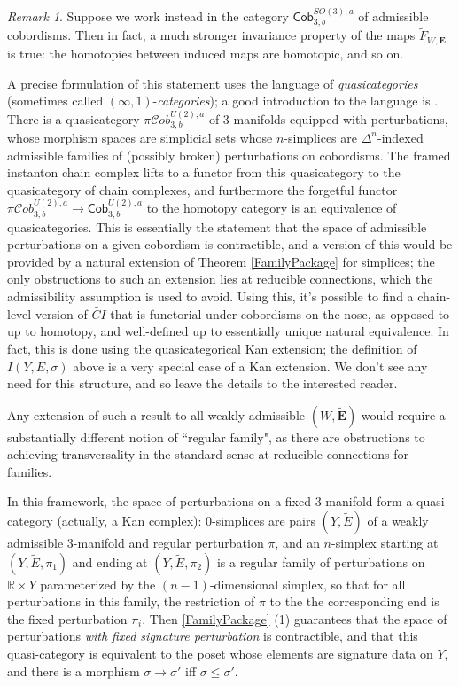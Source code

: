 \documentclass[10pt,a4paper]{amsart}
\theoremstyle{definition}
\theoremstyle{remark}
\newtheorem{remark}[theorem]{Remark}
\numberwithin{figure}{qchap}
\begin{document}
\begin{remark}\label{infty-stuff}Suppose we work instead in the category $\mathsf{Cob}_{3,b}^{SO(3),a}$ of admissible cobordisms. Then in fact, a much stronger invariance property of the maps $\widetilde F_{W,\mathbf{E}}$ is true: the homotopies between induced maps are homotopic, and so on. 

A precise formulation of this statement uses the language of \emph{quasicategories} (sometimes called $(\infty,1)$-\emph{categories}); a good introduction to the language is \cite{HLS}. There is a quasicategory $\pi\mathcal{C}ob_{3,b}^{U(2),a}$ of 3-manifolds equipped with perturbations, whose morphism spaces are simplicial sets whose $n$-simplices are $\Delta^n$-indexed admissible families of (possibly broken) perturbations on cobordisms. The framed instanton chain complex lifts to a functor from this quasicategory to the quasicategory of chain complexes, and furthermore the forgetful functor $\pi\mathcal{C}ob_{3,b}^{U(2),a} \to \mathsf{Cob}_{3,b}^{U(2),a}$ to the homotopy category is an equivalence of quasicategories. This is essentially the statement that the space of admissible perturbations on a given cobordism is contractible, and a version of this would be provided by a natural extension of Theorem \ref{FamilyPackage} for simplices; the only obstructions to such an extension lies at reducible connections, which the admissibility assumption is used to avoid. Using this, it's possible to find a chain-level version of $\widetilde{CI}$ that is functorial under cobordisms on the nose, as opposed to up to homotopy, and well-defined up to essentially unique natural equivalence. In fact, this is done using the quasicategorical Kan extension; the definition of $I(Y,E,\sigma)$ above is a very special case of a Kan extension. We don't see any need for this structure, and so leave the details to the interested reader.

Any extension of such a result to all weakly admissible $(W,\widetilde{\mathbf{E}})$ would require a substantially different notion of ``regular family", as there are obstructions to achieving transversality in the standard sense at reducible connections for families. 

In this framework, the space of perturbations on a fixed 3-manifold form a quasi-category (actually, a Kan complex): $0$-simplices are pairs $(Y,\tilde E)$ of a weakly admissible 3-manifold and regular perturbation $\pi$, and an $n$-simplex starting at $(Y,\tilde E,\pi_1)$ and ending at $(Y,\tilde E,\pi_2)$ is a regular family of perturbations on $\mathbb R \times Y$ parameterized by the $(n-1)$-dimensional simplex, so that for all perturbations in this family, the restriction of $\pi$ to the the corresponding end is the fixed perturbation $\pi_i$. Then \ref{FamilyPackage} (1) guarantees that the space of perturbations \emph{with fixed signature perturbation} is contractible, and that this quasi-category is equivalent to the poset whose elements are signature data on $Y$, and there is a morphism $\sigma \to \sigma'$ iff $\sigma \leq \sigma'$.
\end{remark}
\end{document}
